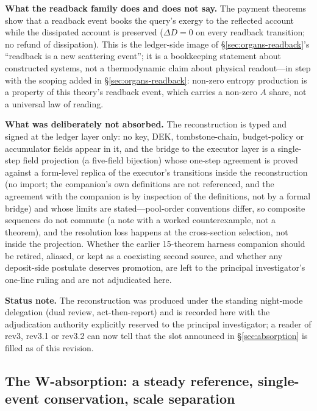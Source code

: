 \documentclass[11pt,a4paper]{article}
\begin{document}
\textbf{What the readback family does and does not say.} The payment theorems show that a readback event books the query's exergy to the reflected account while the dissipated account is preserved ($\Delta D = 0$ on every readback transition; no refund of dissipation). This is the ledger-side image of \S\ref{sec:organs-readback}'s ``readback is a new scattering event''; it is a bookkeeping statement about constructed systems, not a thermodynamic claim about physical readout---in step with the scoping added in \S\ref{sec:organs-readback}: non-zero entropy production is a property of this theory's readback event, which carries a non-zero $A$ share, not a universal law of reading.

\textbf{What was deliberately not absorbed.} The reconstruction is typed and signed at the ledger layer only: no key, DEK, tombstone-chain, budget-policy or accumulator fields appear in it, and the bridge to the executor layer is a single-step field projection (a five-field bijection) whose one-step agreement is proved against a form-level replica of the executor's transitions inside the reconstruction (no import; the companion's own definitions are not referenced, and the agreement with the companion is by inspection of the definitions, not by a formal bridge) and whose limits are stated---pool-order conventions differ, so composite sequences do not commute (a note with a worked counterexample, not a theorem), and the resolution loss happens at the cross-section selection, not inside the projection. Whether the earlier 15-theorem harness companion should be retired, aliased, or kept as a coexisting second source, and whether any deposit-side postulate deserves promotion, are left to the principal investigator's one-line ruling and are not adjudicated here.

\textbf{Status note.} The reconstruction was produced under the standing night-mode delegation (dual review, act-then-report) and is recorded here with the adjudication authority explicitly reserved to the principal investigator; a reader of rev3, rev3.1 or rev3.2 can now tell that the slot announced in \S\ref{sec:absorption} is filled as of this revision.

\subsection{The W-absorption: a steady reference, single-event conservation, scale separation}
\label{sec:absorption-w}
\end{document}
